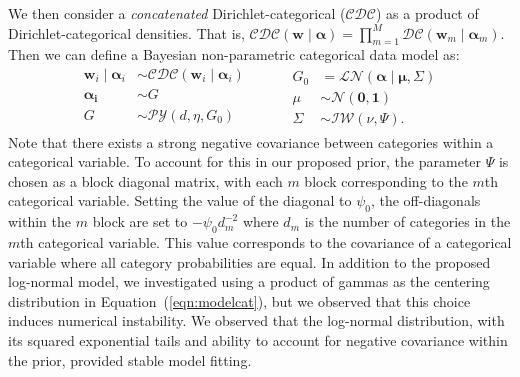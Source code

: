     We then consider a \emph{concatenated} 
    Dirichlet-categorical ($\mathcal{CDC}$) as a product of 
    Dirichlet-categorical densities.  That is, 
    $\mathcal{CDC}(\bm{w}\mid\bm{\alpha}) = 
        \prod_{m = 1}^M\mathcal{DC}(\bm{w}_m\mid\bm{\alpha}_m)$.
    Then we can define a Bayesian non-parametric categorical data model as:
    \begin{equation}
      \label{eqn:modelcat}
      \begin{aligned}
      \bm{w}_i \mid \bm{\alpha}_i &\sim 
        \mathcal{CDC}\left(\bm{w}_i\mid\bm{\alpha}_i\right)\\
      \bm{\alpha_i} &\sim G\\
      G &\sim \mathcal{PY}\left(d, \eta, G_0\right)\\
      \end{aligned}
      ~\hspace{1cm}
      \begin{aligned}
      G_0 &= \mathcal{LN}\left(\bm{\alpha}\mid\bm{\mu},\Sigma\right)\\
      \mu &\sim \mathcal{N}\left(\bm{0},\bm{1}\right)\\
      \Sigma &\sim \mathcal{IW}\left(\nu, \Psi\right).
      \end{aligned}
    \end{equation}
    Note that there  exists a strong negative covariance between categories 
    within a categorical variable.  To account for this in our proposed prior, the 
    parameter $\Psi$ is chosen as a block diagonal matrix, with each $m$ block 
    corresponding to the $m$th categorical variable.  Setting the value of the diagonal 
    to $\psi_0$, the off-diagonals within the $m$ block are set to $-\psi_0 d_m^{-2}$ 
    where $d_m$ is the number of categories in the $m$th categorical variable.
    This value corresponds to the covariance of a categorical variable where all 
    category probabilities are equal. In addition to the proposed log-normal model,
    we investigated using a product of gammas as the centering distribution in
    Equation~(\ref{eqn:modelcat}), but we observed that this choice induces
    numerical instability.  We observed that the log-normal distribution, with
    its squared exponential tails and ability to account for negative covariance
    within the prior, provided stable model fitting.

